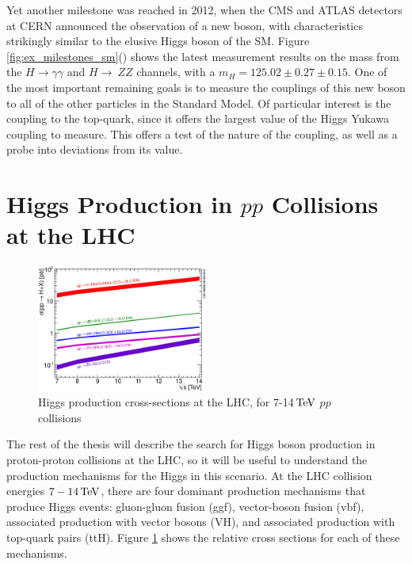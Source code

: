 \par Yet another milestone was reached in 2012, when the CMS and ATLAS
detectors at CERN announced the observation of a new boson, with
characteristics strikingly similar to the elusive Higgs boson of the
SM.  Figure \ref{fig:ex_milestones_sm}() shows
the latest measurement results on the mass from the
$H\rightarrow\gamma\gamma$ and $H\rightarrow~ZZ$ channels, with a
$m_{H} = 125.02 \pm 0.27 \pm 0.15$.  One of the most important
remaining goals is to measure the couplings of this new boson to all
of the other particles in the Standard Model.  Of particular interest
is the coupling to the top-quark, since it offers the largest value of
the Higgs Yukawa coupling to measure.  This offers a test of the
nature of the coupling, as well as a probe into deviations from its
value.   


\section{Higgs Production in $pp$ Collisions at the LHC}
\label{higgs_production_overview}

\begin{figure}[h]
   \centering
  \includegraphics[width=0.5\textwidth]{Figures/Experimental_Results/Higgs_XS_7-14TeV.eps}
  \caption{Higgs production cross-sections at the LHC, for 7-14$\,\text{Te\hspace{-.08em}V}$
    $pp$ collisions} \label{fig:Higgs_XS_7-14TeV}
\end{figure}

\par The rest of the thesis will describe the search for Higgs
boson production in proton-proton collisions at the LHC, so it will be
useful to understand the production mechanisms for the Higgs in this
scenario.  At the LHC collision energies $7-14\,\text{Te\hspace{-.08em}V}$, there are four
dominant production mechanisms that produce Higgs events: gluon-gluon
fusion (ggf), vector-boson fusion (vbf), associated production with
vector bosons (VH), and associated production with top-quark pairs (ttH).  Figure
\ref{fig:Higgs_XS_7-14TeV} shows the relative cross sections for each
of these mechanisms.  


